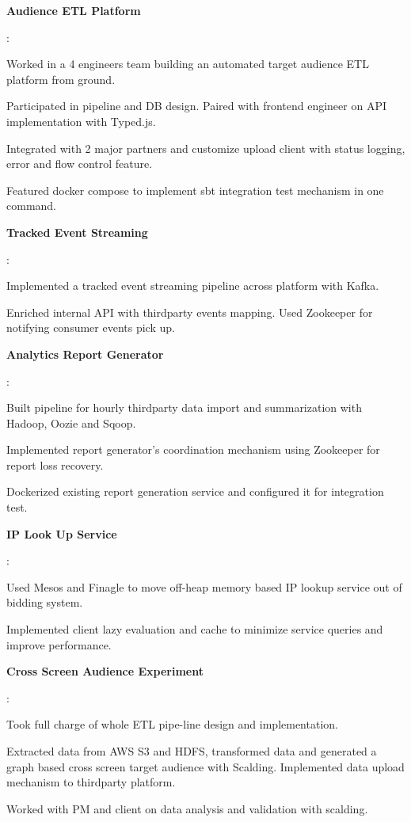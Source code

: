 \documentclass[letterpaper,11pt]{article}
\newcommand{\resumeItem}[2]{
	\item\small{
		\textbf{#1 \hspace{-2pt}}{: #2 \vspace{-2pt}}
	}
}
\begin{document}
	\resumeItem{Audience ETL Platform}{
				\begin{description}[font=$\diamond$\scshape\bfseries,leftmargin=11pt,labelindent=0pt]
					\item Worked in a 4 engineers team building an automated target audience ETL platform from ground. 
					\item Participated in pipeline and DB design. Paired with frontend engineer on API implementation with Typed.js.
					\item Integrated with 2 major partners and customize upload client with status logging, error and flow control feature. 
					\item Featured docker compose to implement sbt integration test mechanism in one command.
				\end{description}
	}
	\resumeItem{Tracked Event Streaming}{
				\begin{description}[font=$\diamond$\scshape\bfseries,leftmargin=11pt,labelindent=0pt]
					\item Implemented a tracked event streaming pipeline across platform with Kafka.	
					\item Enriched internal API with thirdparty events mapping. Used Zookeeper for notifying consumer events pick up.
				\end{description}
	}
	\resumeItem{Analytics Report Generator}{
				\begin{description}[font=$\diamond$\scshape\bfseries,leftmargin=11pt,labelindent=0pt]
					\item Built pipeline for hourly thirdparty data import and summarization  with Hadoop, Oozie and Sqoop.
					\item Implemented report generator's coordination mechanism using Zookeeper for report loss recovery.
					\item Dockerized existing report generation service and configured it for integration test.
				\end{description}
	}
	\resumeItem{IP Look Up Service}{
				\begin{description}[font=$\diamond$\scshape\bfseries,leftmargin=11pt,labelindent=0pt]
					\item Used Mesos and Finagle to move off-heap memory based IP lookup service out of bidding system.
					\item Implemented client lazy evaluation and cache to minimize service queries and improve performance.
				\end{description}
	}
	
	\resumeItem{Cross Screen Audience Experiment}{
				\begin{description}[font=$\diamond$\scshape\bfseries,leftmargin=11pt,labelindent=0pt]
					\item Took full charge of whole ETL pipe-line design and implementation. 
					\item Extracted data from AWS S3 and HDFS, transformed data and generated a graph based cross screen target audience with Scalding. Implemented data upload mechanism to thirdparty platform. 
					\item Worked with PM and client on data analysis and validation with scalding.
				\end{description}
	}
\end{document}
